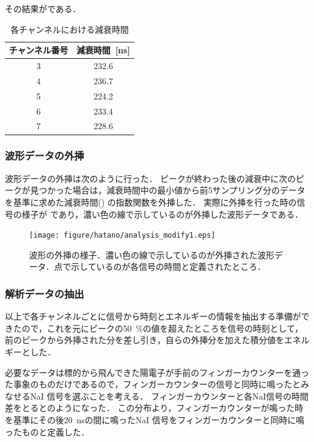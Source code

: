 その結果がである．

\begin{table}[hbt]
\centering
\caption{各チャンネルにおける減衰時間}
\begin{tabular}{cc}\\ \toprule
チャンネル番号 & 減衰時間~[ns]\\ \midrule
3 & 232.6 \\
4 & 236.7 \\
5 & 224.2 \\
6 & 233.4 \\
7 & 228.6 \\ \bottomrule
\end{tabular}
\label{hatano_tab:decaytime}
\end{table}

\subsubsection{波形データの外挿}
波形データの外挿は次のように行った．
ピークが終わった後の減衰中に次のピークが見つかった場合は，減衰時間中の最小値から前5サンプリング分のデータを基準に求めた減衰時間() の指数関数を外挿した．
実際に外挿を行った時の信号の様子が であり，濃い色の線で示しているのが外挿した波形データである．

\begin{figure}[hbt]
\centering
\texttt{[image: figure/hatano/analysis\_modify1.eps]}
\caption{波形の外挿の様子．濃い色の線で示しているのが外挿された波形データ．点で示しているのが各信号の時間と定義されたところ．}
\label{hatano_fig:analysis}
\end{figure}

\subsubsection{解析データの抽出}
以上で各チャンネルごとに信号から時刻とエネルギーの情報を抽出する準備ができたので，これを元にピークの50~\%の値を超えたところを信号の時刻として，前のピークから外挿された分を差し引き，自らの外挿分を加えた積分値をエネルギーとした．

必要なデータは標的から飛んできた陽電子が手前のフィンガーカウンターを通った事象のものだけであるので，フィンガーカウンターの信号と同時に鳴ったとみなせるNaI 信号を選ぶことを考える．
フィンガーカウンターと各NaI信号の時間差をとるとのようになった．
この分布より，フィンガーカウンターが鳴った時を基準にその後20~nsの間に鳴ったNaI 信号をフィンガーカウンターと同時に鳴ったものと定義した．

